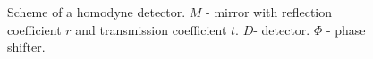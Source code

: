 \begin{figure}
\centering



\caption{Scheme of a homodyne detector. $M$ - mirror with reflection
  coefficient $r$ and transmission coefficient $t$. $D$- detector. $\Phi$
- phase shifter.} 
\label{figPart3Squeezed_12}
\end{figure}